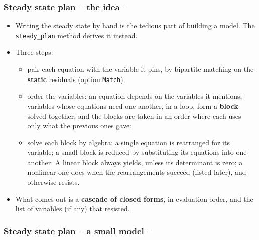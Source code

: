 \documentclass[10pt,slidestop]{beamer}
\theoremstyle{plain}
\begin{document}

\begin{frame}[c,fragile]
  \frametitle{Steady state plan -- the idea --}

  \begin{itemize}

  \item Writing the steady state by hand is the tedious part of building a
    model. The \verb+steady_plan+ method derives it instead.\newline

  \item Three steps:
    \begin{itemize}
    \item[--] pair each equation with the variable it pins, by bipartite
      matching on the \textbf{static} residuals (option \verb+Match+);
    \item[--] order the variables: an equation depends on the variables it
      mentions; variables whose equations need one another, in a loop, form a
      \textbf{block} solved together, and the blocks are taken in an order where
      each uses only what the previous ones gave;
    \item[--] solve each block by algebra: a single equation is rearranged for its
      variable; a small block is reduced by substituting its equations into one
      another. A linear block always yields, unless its determinant is zero; a
      nonlinear one does when the rearrangements succeed (listed later), and
      otherwise resists.
    \end{itemize}

  \item What comes out is a \textbf{cascade of closed forms}, in evaluation
    order, and the list of variables (if any) that resisted.

  \end{itemize}

\end{frame}


\begin{frame}[c,fragile]
  \frametitle{Steady state plan -- a small model --}

  

\end{frame}
\end{document}
